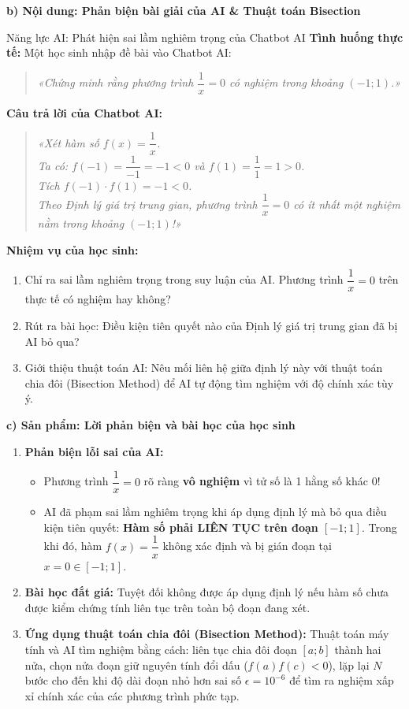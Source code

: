 \documentclass[12pt, a4paper]{article}
\begin{document}
\noindent \textbf{b) Nội dung: Phản biện bài giải của AI \& Thuật toán Bisection}
\begin{aibox}{Năng lực AI: Phát hiện sai lầm nghiêm trọng của Chatbot AI}
\textbf{Tình huống thực tế:} Một học sinh nhập đề bài vào Chatbot AI:
\begin{quote}
\textit{«Chứng minh rằng phương trình $\dfrac{1}{x} = 0$ có nghiệm trong khoảng $(-1; 1)$.»}
\end{quote}
\textbf{Câu trả lời của Chatbot AI:}
\begin{quote}
\textit{«Xét hàm số $f(x) = \dfrac{1}{x}$.\\
Ta có: $f(-1) = \dfrac{1}{-1} = -1 < 0$ và $f(1) = \dfrac{1}{1} = 1 > 0$.\\
Tích $f(-1) \cdot f(1) = -1 < 0$.\\
Theo Định lý giá trị trung gian, phương trình $\dfrac{1}{x} = 0$ có ít nhất một nghiệm nằm trong khoảng $(-1; 1)$!»}
\end{quote}
\textbf{Nhiệm vụ của học sinh:}
\begin{enumerate}[leftmargin=0.6cm]
    \item Chỉ ra sai lầm nghiêm trọng trong suy luận của AI. Phương trình $\dfrac{1}{x} = 0$ trên thực tế có nghiệm hay không?
    \item Rút ra bài học: Điều kiện tiên quyết nào của Định lý giá trị trung gian đã bị AI bỏ qua?
    \item Giới thiệu thuật toán AI: Nêu mối liên hệ giữa định lý này với thuật toán chia đôi (Bisection Method) để AI tự động tìm nghiệm với độ chính xác tùy ý.
\end{enumerate}
\end{aibox}

\noindent \textbf{c) Sản phẩm: Lời phản biện và bài học của học sinh}
\begin{enumerate}[leftmargin=0.6cm]
    \item \textbf{Phản biện lỗi sai của AI:}
    \begin{itemize}
        \item Phương trình $\dfrac{1}{x} = 0$ rõ ràng \textbf{vô nghiệm} vì tử số là 1 hằng số khác 0!
        \item AI đã phạm sai lầm nghiêm trọng khi áp dụng định lý mà bỏ qua điều kiện tiên quyết: \textbf{Hàm số phải LIÊN TỤC trên đoạn $[-1; 1]$}. Trong khi đó, hàm $f(x) = \dfrac{1}{x}$ không xác định và bị gián đoạn tại $x = 0 \in [-1; 1]$.
    \end{itemize}
    \item \textbf{Bài học đắt giá:} Tuyệt đối không được áp dụng định lý nếu hàm số chưa được kiểm chứng tính liên tục trên toàn bộ đoạn đang xét.
    \item \textbf{Ứng dụng thuật toán chia đôi (Bisection Method):} Thuật toán máy tính và AI tìm nghiệm bằng cách: liên tục chia đôi đoạn $[a; b]$ thành hai nửa, chọn nửa đoạn giữ nguyên tính đổi dấu ($f(a)f(c) < 0$), lặp lại $N$ bước cho đến khi độ dài đoạn nhỏ hơn sai số $\epsilon = 10^{-6}$ để tìm ra nghiệm xấp xỉ chính xác của các phương trình phức tạp.
\end{enumerate}
\end{document}
